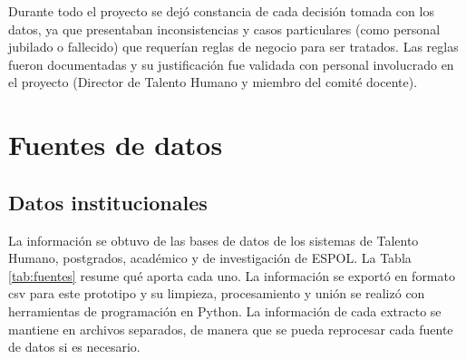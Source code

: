 Durante todo el proyecto se dejó constancia de cada decisión tomada con los datos, ya que presentaban inconsistencias y casos particulares (como personal jubilado o fallecido) que requerían reglas de negocio para ser tratados. Las reglas fueron documentadas y su justificación fue validada con personal involucrado en el proyecto (Director de Talento Humano y miembro del comité docente).

\section{Fuentes de datos}
\label{sec:met_fuentes}

\subsection{Datos institucionales}

La información se obtuvo de las bases de datos de los sistemas de Talento Humano, postgrados, académico y de investigación de ESPOL. La Tabla \ref{tab:fuentes} resume qué aporta cada uno. La información se exportó en formato csv para este prototipo y su limpieza, procesamiento y unión se realizó con herramientas de programación en Python. La información de cada extracto se mantiene en archivos separados, de manera que se pueda reprocesar cada fuente de datos si es necesario.

